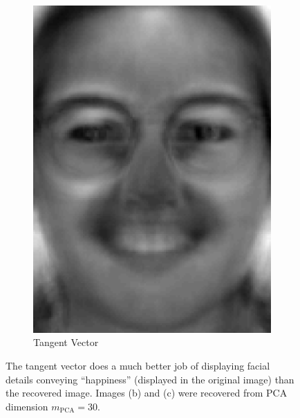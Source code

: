 \documentclass[review]{elsarticle}
\begin{document}
\begin{figure}[H]
\begin{subfigure}[b]{0.18\textwidth}
	\includegraphics[width=\linewidth]{Fig_4c}
		\caption{Tangent Vector}
	\label{fig:tv_ex_2}
	\hfill
\end{subfigure}
\hspace*{\fill}
\caption{The tangent vector does a much better job of displaying facial details conveying ``happiness'' (displayed in the original image) than the recovered image. Images (b) and (c) were recovered from PCA dimension $m_\mathrm{PCA}=30$.}
\label{fig:AR_PCA_2}
\end{figure}
\end{document}

